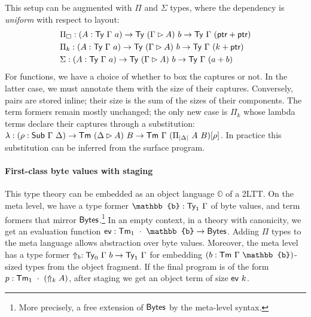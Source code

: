 This setup can be augmented with $\Pi$ and $\Sigma$ types, where the dependency
is \emph{uniform} with respect to layout:
\begin{align*}
&\Pi_\square : (A : \Ty\ \Gamma\ a) \to \Ty\ (\Gamma \rhd A)\ b \to \Ty\ \Gamma\ (\ptr + \ptr) \\
&\Pi_k : (A : \Ty\ \Gamma\ a) \to \Ty\ (\Gamma \rhd A)\ b \to \Ty\ \Gamma\ (k + \ptr) \\
&\Sigma : (A : \Ty\ \Gamma\ a) \to \Ty\ (\Gamma \rhd A)\ b \to \Ty\ \Gamma\ (a + b)
\end{align*}
For functions, we have a choice of whether to box the captures or
not. In the latter case, we must annotate them with the size of their captures.
Conversely, pairs are stored inline; their size is the sum of the sizes of their
components. The term formers remain mostly unchanged; the only new case is
$\Pi_k$ whose lambda terms declare their captures through a substitution:
$\lambda : (\rho : \syn{Sub}\ \Gamma\ \Delta) \to \Tm\ (\Delta \rhd A)\ B \to \Tm\ \Gamma\ (\Pi_{|\Delta|}\ A\ B)[\rho]$.
In practice this substitution can be inferred from the surface program.

\paragraph{First-class byte values with staging}\label{layouts-staging}

This type theory can be embedded as an object language $\mathbb{O}$ of a 2LTT.
On the meta level, we have a type former $\mathbb{b} : \Ty_1\ \Gamma$ of byte
values, and term formers that mirror $\textsf{Bytes}$.\footnote{%
More precisely, a free extension \cite{Yallop2018-zw} of $\textsf{Bytes}$ by the
meta-level syntax.}
In an empty context, in a theory with canonicity, we get an
evaluation function $\syn{ev} : \Tm_1\ \cdot\ \mathbb{b} \to \Bytes$.
Adding $\Pi$ types to the meta language
allows abstraction over byte values. Moreover, the meta level has a type former
$\Uparrow_b : \Ty_0\ \Gamma\ b \to \Ty_1\ \Gamma$ for embedding $(b : \Tm\ \Gamma\ \mathbb{b})$-sized types from
the object fragment. If the final program is of the form $p :
\textsf{Tm}_1\ \cdot\ (\Uparrow_k A)$, after staging we get an object term of size $\textsf{ev}\ k$.






